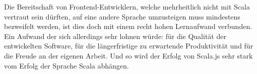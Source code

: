 \documentclass[a4paper, 12pt, hidelinks, listof=totoc, listoftables=totoc, bibliography=totoc]{scrreprt}
\begin{document}
Die Bereitschaft von Frontend-Entwicklern, welche mehrheitlich nicht mit Scala vertraut sein dürften, auf eine andere Sprache umzusteigen muss mindestens bezweifelt werden, ist dies doch mit einem recht hohen Lernaufwand verbunden. Ein Aufwand der sich allerdings sehr lohnen würde: für die Qualität der entwickelten Software, für die längerfristige zu erwartende Produktivität und für die Freude an der eigenen Arbeit. Und so wird der Erfolg von Scala.js sehr stark vom Erfolg der Sprache Scala abhängen.











%
%
%
%




\clearpage
{}
\end{document}
